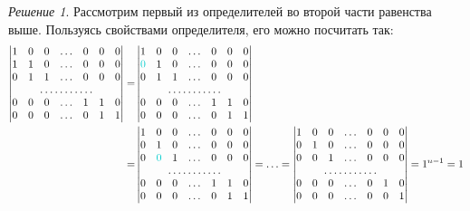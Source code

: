 \documentclass[a4paper,12pt]{article}
\theoremstyle{definition}
\theoremstyle{remark}
\theoremstyle{remark}
\theoremstyle{remark}
\newtheorem*{solution}{Решение}
\begin{document}
\begin{solution}
    Рассмотрим первый из определителей во второй части равенства выше.
    Пользуясь свойствами определителя, его можно посчитать так:
    \begin{equation*}
    \begin{split}
      \begin{vmatrix}
        1 & 0 & 0 & \ldots & 0 & 0 & 0\\
        1 & 1 & 0 & \ldots & 0 & 0 & 0\\
        0 & 1 & 1 & \ldots & 0 & 0 & 0\\
        \hdotsfor{7}\\
        0 & 0 & 0 & \ldots & 1 & 1 & 0\\
        0 & 0 & 0 & \ldots & 0 & 1 & 1
      \end{vmatrix}
      = &\begin{vmatrix}
          1 & 0 & 0 & \ldots & 0 & 0 & 0\\
          \textcolor{light-cyan}{0} & 1 & 0 & \ldots & 0 & 0 & 0\\
          0 & 1 & 1 & \ldots & 0 & 0 & 0\\
          \hdotsfor{7}\\
          0 & 0 & 0 & \ldots & 1 & 1 & 0\\
          0 & 0 & 0 & \ldots & 0 & 1 & 1
        \end{vmatrix}\\
      = &\begin{vmatrix}
          1 & 0 & 0 & \ldots & 0 & 0 & 0\\
          0 & 1 & 0 & \ldots & 0 & 0 & 0\\
          0 & \textcolor{light-cyan}{0} & 1 & \ldots & 0 & 0 & 0\\
          \hdotsfor{7}\\
          0 & 0 & 0 & \ldots & 1 & 1 & 0\\
          0 & 0 & 0 & \ldots & 0 & 1 & 1
        \end{vmatrix}
      = \ldots
      = \begin{vmatrix}
          1 & 0 & 0 & \ldots & 0 & 0 & 0\\
          0 & 1 & 0 & \ldots & 0 & 0 & 0\\
          0 & 0 & 1 & \ldots & 0 & 0 & 0\\
          \hdotsfor{7}\\
          0 & 0 & 0 & \ldots & 0 & 1 & 0\\
          0 & 0 & 0 & \ldots & 0 & 0 & 1
        \end{vmatrix}
      = 1^{n - 1}
      = 1
    \end{split}
    \end{equation*}
    

\end{solution}
\end{document}
